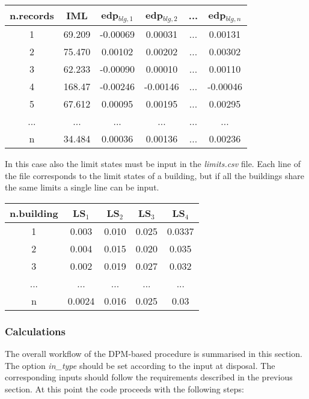 \begin{table}[!htbp]
\centering
\begin{tabular}{|c|c|c|c|c|c|} \hline
\textbf{n.records} & \textbf{IML} & \textbf{edp$_{blg,1}$} & \textbf{edp$_{blg,2}$} & \textbf{...} & \textbf{edp$_{blg,n}$} \\ \hline
1 &	69.209 &	-0.00069 &	0.00031 & ... &	0.00131\\ \hline
2 &	75.470 &	0.00102 & 	0.00202 & ... &	0.00302\\ \hline
3 &	62.233 &	-0.00090 &	0.00010 & ... &	0.00110\\ \hline
4 &	168.47 &	-0.00246 &	-0.00146 & ... &	-0.00046\\ \hline
5 &	67.612 &	0.00095 & 	0.00195 & ... &	0.00295\\ \hline
... & ... & ... & ... & ... & ...\\ \hline
n &	34.484 &	0.00036 & 	0.00136 & ... & 	0.00236\\ \hline
\end{tabular}
\end{table}

In this case also the limit states must be input in the \textit{limits.csv} file. Each line of the file corresponds to the limit states of a building, but if all the buildings share the same limits a single line can be input.

\begin{table}[!htbp]
\centering
\begin{tabular}{|c|c|c|c|c|} \hline
\textbf{n.building} & \textbf{LS$_1$} & \textbf{LS$_2$} & \textbf{LS$_3$} & \textbf{LS$_4$} \\ \hline
1 & 0.003 &	0.010 &	0.025 &	0.0337\\ \hline
2 & 0.004 &	0.015 &	0.020 &	0.035\\ \hline
3 & 0.002 &	0.019 &	0.027 &	0.032\\ \hline
... & ... & ... & ... & ...\\ \hline
n & 0.0024 &	0.016 &	0.025 &	0.03\\ \hline
\end{tabular}
\end{table}

\subsubsection{Calculations}
The overall workflow of the DPM-based procedure is summarised in this section. The option \textit{in\_type} should be set according to the input at disposal. The corresponding inputs should follow the requirements described in the previous section. At this point the code proceeds with the following steps:

